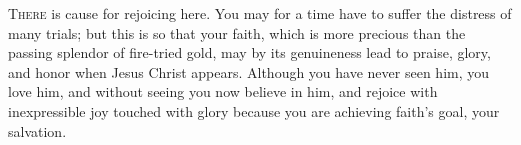 
\lettrine{T}{here} is cause for rejoicing here. You may for a time have to suffer the distress of many trials; but this is so that your faith, which is more precious than the passing splendor of fire-tried gold, may by its genuineness lead to praise, glory, and honor when Jesus Christ appears. Although you have never seen him, you love him, and without seeing you now believe in him, and rejoice with inexpressible joy touched with glory because you are achieving faith’s goal, your salvation.